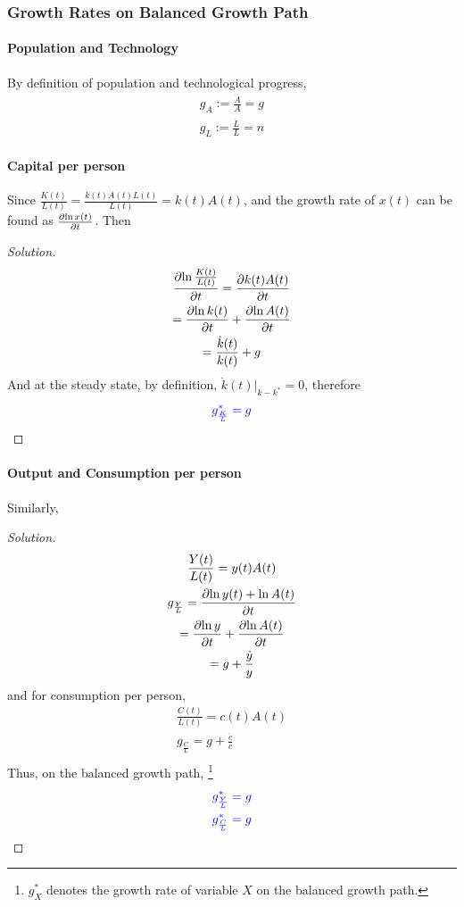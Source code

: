 \documentclass[11pt]{article}
\begin{document}
			\subsubsection{Growth Rates on Balanced Growth Path}
			\paragraph{Population and Technology} By definition of population and technological progress,
			\begin{gather}
				g_A := \frac{\dot{A}}{A} = g \\
				g_L := \frac{\dot{L}}{L} = n
			\end{gather}
			
			\paragraph{Capital per person} Since $\frac{K(t)}{L(t)} = \frac{k(t)A(t)L(t)}{L(t)} = k(t)A(t)$, and the growth rate of $x(t)$ can be found as $\frac{\partial{\ln{x(t)}}}{\partial{t}}$. Then
			\begin{proof}[Solution]
				\begin{gather*}
					\frac{\partial{\ln{\frac{K(t)}{L(t)}}}}{\partial{t}} = \frac{\partial{k(t)A(t)}}{\partial{t}} \\
					= \frac{\partial{\ln{k(t)}}}{\partial{t}} + \frac{\partial{\ln{A(t)}}}{\partial{t}} \\
					= \frac{\dot{k}(t)}{k(t)} + g \\
				\end{gather*}
				And at the steady state, by definition, $\dot{k}(t)|_{k-k^*} = 0$, therefore 
				\begin{equation}
					\textcolor{blue}{
						g_{\frac{K}{L}}^* = g
					}
				\end{equation}
			\end{proof}
			
			\paragraph{Output and Consumption per person} Similarly,
			\begin{proof}[Solution]
				\begin{gather*}
					\frac{Y(t)}{L(t)} = y(t)A(t) \\
					g_{\frac{Y}{L}} = \frac{\partial{\ln{y(t)} + \ln{A(t)}}}{\partial{t}} \\
					= \frac{\partial{\ln{y}}}{\partial{t}} + \frac{\partial{\ln{A(t)}}}{\partial{t}} \\
					= g + \frac{\dot{y}}{y}
				\end{gather*}
				and for consumption per person,
				\begin{gather*}
					\frac{C(t)}{L(t)} = c(t)A(t)\\
					g_{\frac{C}{L}} = g + \frac{\dot{c}}{c} \\
				\end{gather*}
				Thus, on the balanced growth path, \footnote{$g_X^*$ denotes the growth rate of variable $X$ on the balanced growth path.}
				\begin{gather}
					\textcolor{blue}{
						g_{\frac{Y}{L}}^* = g
					}
					\\
					\textcolor{blue}{
						g_{\frac{C}{L}}^* = g
					}
				\end{gather}
			\end{proof}
			
\end{document}
